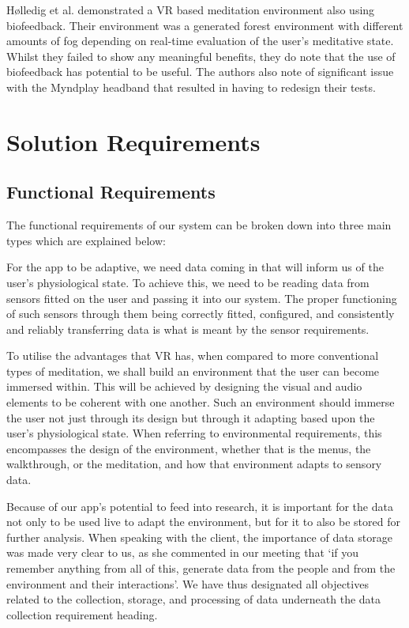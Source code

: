 \documentclass[coverpage,lineno]{../custom}
\begin{document}
Hølledig et al. \cite{holledig_zenvr_2018} demonstrated a VR based meditation environment also using biofeedback. Their environment was a generated forest environment with different amounts of fog depending on real-time evaluation of the user's meditative state. Whilst they failed to show any meaningful benefits, they do note that the use of biofeedback has potential to be useful. The authors also note of significant issue with the Myndplay headband that resulted in having to redesign their tests.

\newpage
\section{Solution Requirements}
\label{sec:req}

\subsection{Functional Requirements}
\label{ssec:f_req}

The functional requirements of our system can be broken down into three main types which are explained below:

\begin{description}[font=\bfseries, leftmargin=1cm, style=nextline]
\item[Sensor]
For the app to be adaptive, we need data coming in that will inform us of the user’s physiological state. To achieve this, we need to be reading data from sensors fitted on the user and passing it into our system. The proper functioning of such sensors through them being correctly fitted, configured, and consistently and reliably transferring data is what is meant by the sensor requirements.
\item[Environmental]
To utilise the advantages that VR has, when compared to more conventional types of meditation, we shall build an environment that the user can become immersed within. This will be achieved by designing the visual and audio elements to be coherent with one another. Such an environment should immerse the user not just through its design but through it adapting based upon the user’s physiological state. When referring to environmental requirements, this encompasses the design of the environment, whether that is the menus, the walkthrough, or the meditation, and how that environment adapts to sensory data.
\item[Data Collection]
Because of our app's potential to feed into research, it is important for the data not only to be used live to adapt the environment, but for it to also be stored for further analysis. When speaking with the client, the importance of data storage was made very clear to us, as she commented in our meeting that `if you remember anything from all of this, generate data from the people and from the environment and their interactions'.
We have thus designated all objectives related to the collection, storage, and processing of data underneath the data collection requirement heading.
\end{description}
\end{document}
